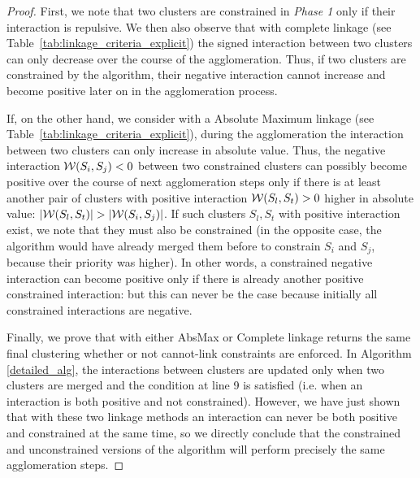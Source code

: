 \begin{proof}
First, we note that two clusters are constrained in \emph{Phase 1} only if their interaction is repulsive. We then also observe that with complete linkage (see Table~\ref{tab:linkage_criteria_explicit}) the signed interaction between two clusters can only decrease over the course of the agglomeration. Thus, if two clusters are constrained by the algorithm, their negative interaction cannot increase and become positive later on in the agglomeration process.

If, on the other hand, we consider \algname{} with a Absolute Maximum linkage (see Table~\ref{tab:linkage_criteria_explicit}), during the agglomeration the interaction between two clusters can only increase in absolute value. Thus, the negative interaction $\mathcal{W}{}(S_i,S_j)<0$ between two constrained clusters can possibly become positive over the course of next agglomeration steps only if there is at least another pair of clusters with positive interaction $\mathcal{W}{}(S_l,S_t)>0$ higher in absolute value: $|\mathcal{W}{}(S_l,S_t)| > |\mathcal{W}{}(S_i,S_j)|$.
If such clusters $S_l, S_t$ with positive interaction exist, we note that they must also be constrained (in the opposite case, the algorithm would have already merged them before to constrain $S_i$ and $S_j$, because their priority was higher). In other words, a constrained negative interaction can become positive only if there is already another positive constrained interaction: but this can never be the case because initially all constrained interactions are negative.

Finally, we prove that \algname{} with either AbsMax or Complete linkage returns the same final clustering whether or not cannot-link constraints are enforced. In Algorithm \ref{detailed_alg}, the interactions between clusters are updated only when two clusters are merged and the condition at line 9 is satisfied (i.e. when an interaction is both positive and not constrained). However, we have just shown that with these two linkage methods an interaction can never be both positive and constrained at the same time, so we directly conclude that the constrained and unconstrained versions of the algorithm will perform precisely the same agglomeration steps.
\end{proof}


\absmaxmutex*

